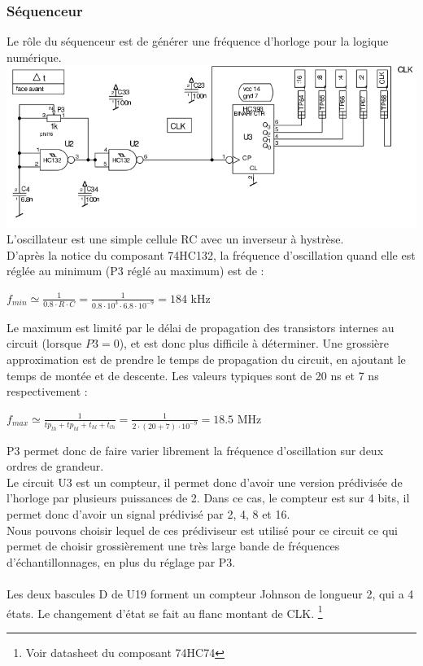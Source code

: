 \documentclass{article}
\begin{document}
\subsubsection{Séquenceur}
Le rôle du séquenceur est de générer une fréquence d'horloge pour la logique numérique.\\
\includegraphics[width = 1\linewidth]{shema_sequenceur_1.png}
L'oscillateur est une simple cellule RC avec un inverseur à hystrèse.\\
D'après la notice du composant 74HC132, la fréquence d'oscillation quand elle est réglée au minimum (P3 réglé au maximum) est de :
\begin{center}
$f_{min} \simeq \frac{1}{0.8 \cdot R \cdot C} = \frac{1}{0.8 \cdot 10^3 \cdot 6.8 \cdot 10^{-9}} = 184 $ kHz
\end{center}
Le maximum est limité par le délai de propagation des transistors internes au circuit (lorsque $P3 = 0$), et est donc plus difficile à déterminer. Une grossière approximation est de prendre le temps de propagation du circuit, en ajoutant le temps de montée et de descente. Les valeurs typiques sont de 20 ns et 7 ns respectivement :
\begin{center}
$f_{max} \simeq \frac{1}{tp_{lh} + tp_{hl} + t_{hl} + t_{lh}} = \frac{1}{2 \cdot (20+7) \cdot 10^{-9}} = 18.5 $ MHz
\end{center}
P3 permet donc de faire varier librement la fréquence d'oscillation sur deux ordres de grandeur.
\\
Le circuit U3 est un compteur, il permet donc d'avoir une version prédivisée de l'horloge par plusieurs puissances de 2. Dans ce cas, le compteur est sur 4 bits, il permet donc d'avoir un signal prédivisé par 2, 4, 8 et 16.\\
Nous pouvons choisir lequel de ces prédiviseur est utilisé pour ce circuit ce qui permet de choisir grossièrement une très large bande de fréquences d'échantillonnages, en plus du réglage par P3.
\\\\
Les deux bascules D de U19 forment un compteur Johnson de longueur 2, qui a 4 états. Le changement d'état se fait au flanc montant de CLK. \footnote{Voir datasheet du composant 74HC74}\\
\end{document}
